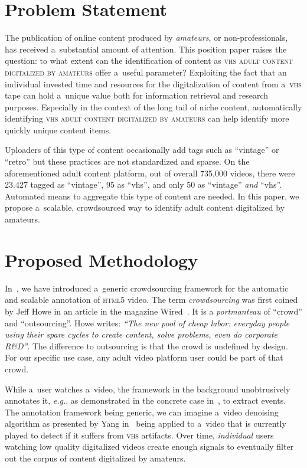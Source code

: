 \documentclass{sig-alternate}
\begin{document}
\section{Problem Statement}

The publication of online content produced by
\emph{amateurs}, or non-professionals, has
received a~substantial amount of attention.
This position paper raises the question: to what extent
can the identification of content as {\scshape vhs adult content digitalized by amateurs}
offer a~useful parameter?
Exploiting the fact that an individual invested time and resources for the
digitalization of content from a~{\scshape vhs} tape can hold a~unique value
both for information retrieval and research purposes.
Especially in the context of the long tail of niche content,
automatically identifying {\scshape vhs adult content digitalized by amateurs}
can help identify more quickly unique content items.

Uploaders of this type of content occasionally add tags
such as ``vintage'' or ``retro'' but these practices are not standardized and sparse.
On the aforementioned adult content platform, out of overall 735,000 videos,
there were 23.427 tagged as ``vintage'', 95 as ``vhs'',
and only 50 as ``vintage'' \emph{and} ``vhs''.
Automated means to aggregate this type of content are needed.
In this paper, we propose a~scalable, crowdsourced way
to identify adult content digitalized by amateurs.

\section{Proposed Methodology}

In~\cite{steiner2011crowdsourcing}, we have introduced
a~generic crowdsourcing framework for the automatic and scalable
annotation of {\scshape html5} video.
The term \emph{crowdsourcing} was first coined by Jeff Howe
in an article in the magazine Wired~\cite{crowdsourcing}.
It is a \textit{portmanteau} of ``crowd'' and ``outsourcing''.
Howe writes: \textit{``The new pool of cheap labor:
everyday people using their spare cycles to create content,
solve problems, even do corporate R\&D''}.
The difference to outsourcing is that the crowd is undefined by design.
For our specific use case, any adult video platform user
could be part of that crowd. 

While a~user watches a~video, the framework in the background
unobtrusively annotates it, \emph{e.g.}, as demonstrated
in the concrete case in~\cite{steiner2011crowdsourcing},
to extract events.
The annotation framework being generic,
we can imagine a~video denoising algorithm
as presented by Yang in~\cite{yang2009videonoise}
being applied to a~video that is currently played
to detect if it suffers from {\scshape vhs} artifacts.
Over time, \emph{individual} users watching low quality digitalized videos
create enough signals to eventually filter out the corpus of
content digitalized by amateurs.
\end{document}

